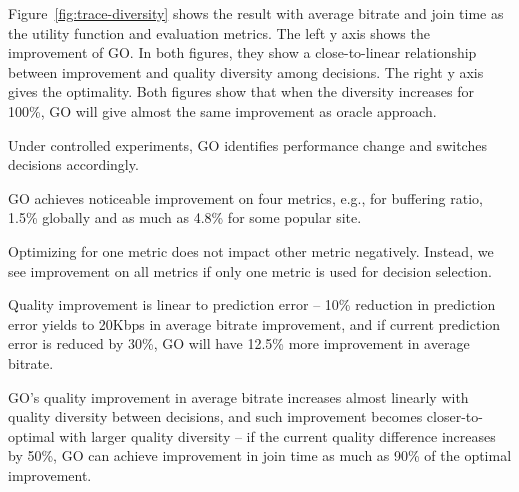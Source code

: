 Figure~\ref{fig:trace-diversity} shows the result with average bitrate and join time as the utility function and evaluation metrics. The left y axis shows the improvement of GO. In both figures, they show a close-to-linear relationship between improvement and quality diversity among decisions. 
The right y axis gives the optimality. Both figures show that when the diversity increases for 100\%, GO will give almost the same improvement as oracle approach. 



\begin{packedenumerate}
	\item Under controlled experiments, GO identifies performance change and switches decisions accordingly.
	\item GO achieves noticeable improvement on four metrics, e.g., for buffering ratio, 1.5\% globally and as much as 4.8\% for some popular site.
	\item Optimizing for one metric does not impact other metric negatively. Instead, we see improvement on all metrics if only one metric is used for decision selection.
	\item Quality improvement is linear to prediction error -- 10\% reduction in prediction error yields to 20Kbps in average bitrate improvement, and if current prediction error is reduced by 30\%, GO will have 12.5\% more improvement in average bitrate.
	\item GO's quality improvement in average bitrate increases almost linearly with quality diversity between decisions, and such improvement becomes closer-to-optimal with larger quality diversity -- if the current quality difference increases by 50\%, GO can achieve improvement in join time as much as 90\% of the optimal improvement.
\end{packedenumerate}


